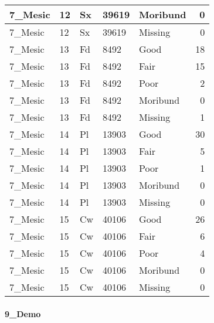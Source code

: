 \documentclass[
]{article}
\begin{document}
\begin{tabular}{l|l|l|l|l|r}
\hline
7\_Mesic & 12 & Sx & 39619 & Moribund & 0\\
\hline
7\_Mesic & 12 & Sx & 39619 & Missing & 0\\
\hline
7\_Mesic & 13 & Fd & 8492 & Good & 18\\
\hline
7\_Mesic & 13 & Fd & 8492 & Fair & 15\\
\hline
7\_Mesic & 13 & Fd & 8492 & Poor & 2\\
\hline
7\_Mesic & 13 & Fd & 8492 & Moribund & 0\\
\hline
7\_Mesic & 13 & Fd & 8492 & Missing & 1\\
\hline
7\_Mesic & 14 & Pl & 13903 & Good & 30\\
\hline
7\_Mesic & 14 & Pl & 13903 & Fair & 5\\
\hline
7\_Mesic & 14 & Pl & 13903 & Poor & 1\\
\hline
7\_Mesic & 14 & Pl & 13903 & Moribund & 0\\
\hline
7\_Mesic & 14 & Pl & 13903 & Missing & 0\\
\hline
7\_Mesic & 15 & Cw & 40106 & Good & 26\\
\hline
7\_Mesic & 15 & Cw & 40106 & Fair & 6\\
\hline
7\_Mesic & 15 & Cw & 40106 & Poor & 4\\
\hline
7\_Mesic & 15 & Cw & 40106 & Moribund & 0\\
\hline
7\_Mesic & 15 & Cw & 40106 & Missing & 0\\
\hline
\end{tabular}

\hypertarget{demo-1}{%
\paragraph{9\_Demo}\label{demo-1}}
\end{document}
